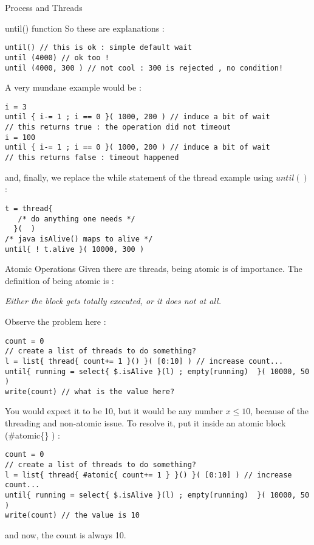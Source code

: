 \begin{section}{Process and Threads}
\begin{subsection}{until() function}
So these are explanations :

\begin{lstlisting}[style=JexlStyle]
until() // this is ok : simple default wait  
until (4000) // ok too !
until (4000, 300 ) // not cool : 300 is rejected , no condition!
\end{lstlisting}       

A very mundane example would be :

\begin{lstlisting}[style=JexlStyle]
i = 3 
until { i-= 1 ; i == 0 }( 1000, 200 ) // induce a bit of wait 
// this returns true : the operation did not timeout 
i = 100 
until { i-= 1 ; i == 0 }( 1000, 200 ) // induce a bit of wait 
// this returns false : timeout happened  
\end{lstlisting}       

and, finally, we replace the while statement 
of the thread example using $until()$ :

\begin{lstlisting}[style=JexlStyle]
t = thread{  
   /* do anything one needs */
  }(  )
/* java isAlive() maps to alive */
until{ ! t.alive }( 10000, 300 )
\end{lstlisting}
\end{subsection}

\begin{subsection}{Atomic Operations}
Given there are threads, being atomic is of importance.
The definition of being atomic is :
\begin{center}\emph{Either the block gets totally executed, or it does not at all. }\end{center}
Observe the problem here :

\begin{lstlisting}[style=JexlStyle]
count = 0 
// create a list of threads to do something?
l = list{ thread{ count+= 1 }() }( [0:10] ) // increase count...
until{ running = select{ $.isAlive }(l) ; empty(running)  }( 10000, 50 )
write(count) // what is the value here?
\end{lstlisting}

You would expect it to be 10, but it would be any number $x \le 10$,
because of the threading and non-atomic issue. To resolve it, 
put it inside an atomic block (\#atomic\{\} ) : 

\begin{lstlisting}[style=JexlStyle]
count = 0 
// create a list of threads to do something?
l = list{ thread{ #atomic{ count+= 1 } }() }( [0:10] ) // increase count...
until{ running = select{ $.isAlive }(l) ; empty(running)  }( 10000, 50 )
write(count) // the value is 10
\end{lstlisting}
and now, the count is always 10.


\end{subsection}
\end{section}
